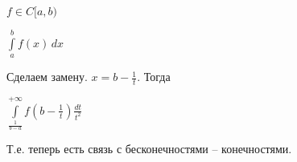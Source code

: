 \begin{remark}\slashns
	
	$f \in C[a,b)$
	
	$\int\limits_a^b f(x) \, dx$
	
	Сделаем замену. $x = b - \frac1t$. Тогда 
	
	$\int\limits_{\frac1{b-a}}^{+\infty} f(b - \frac1t)\frac{dt}{t^2}$
	
	Т.е. теперь есть связь с бесконечностями -- конечностями.
\end{remark}
